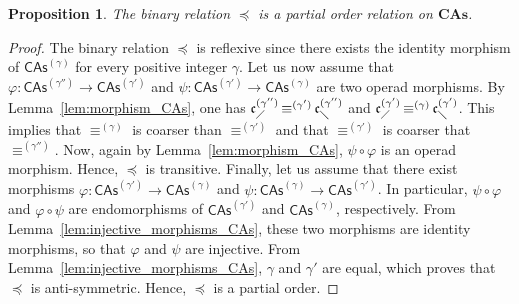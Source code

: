 \documentclass[10pt,reqno]{amsart}
\numberwithin{equation}{subsection}
\newtheorem{Proposition}[Theorem]{Proposition}
\newcommand{\CAs}[1]{\mathsf{CAs}^{(#1)}}
\newcommand{\CAsAll}{\mathbf{CAs}}
\newcommand{\LComb}[1]{\mathfrak{c}^{(#1)}_{\diagup}}
\newcommand{\RComb}[1]{\mathfrak{c}^{(#1)}_{\diagdown}}
\newcommand{\OrdCAs}{\preceq}
\DeclareMathOperator{\Congr}{\equiv}
\newcommand{\CongrCAs}[1]{\Congr^{(#1)}}
\begin{document}
\begin{Proposition}\label{prop:poset_CAs}
    The binary relation $\OrdCAs$ is a partial order relation on
    $\CAsAll$.
\end{Proposition}
\begin{proof}
    The binary relation $\OrdCAs$ is reflexive since there exists the
    identity morphism of $\CAs{\gamma}$ for every positive integer
    $\gamma$. Let us now assume that
    $\varphi:\CAs{\gamma''} \to \CAs{\gamma'}$ and
    $\psi:\CAs{\gamma'} \to \CAs{\gamma}$ are two operad morphisms. By
    Lemma~\ref{lem:morphism_CAs}, one has
    $\LComb{\gamma''} \CongrCAs{\gamma'} \RComb{\gamma''}$ and
    $\LComb{\gamma'} \CongrCAs{\gamma} \RComb{\gamma'}$. This implies
    that $\CongrCAs{\gamma}$ is coarser than $\CongrCAs{\gamma'}$ and
    that $\CongrCAs{\gamma'}$ is coarser that $\CongrCAs{\gamma''}$. Now,
    again by Lemma~\ref{lem:morphism_CAs}, $\psi \circ \varphi$ is an
    operad morphism. Hence, $\OrdCAs$ is transitive. Finally, let us
    assume that there exist morphisms
    $\varphi:\CAs{\gamma'}\to\CAs{\gamma}$ and
    $\psi:\CAs{\gamma}\to\CAs{\gamma'}$. In particular,
    $\psi \circ \varphi$ and $\varphi \circ \psi$ are endomorphisms of
    $\CAs{\gamma'}$ and $\CAs{\gamma}$, respectively. From
    Lemma~\ref{lem:injective_morphisms_CAs}, these two morphisms are
    identity morphisms, so that $\varphi$ and $\psi$ are injective. From
    Lemma~\ref{lem:injective_morphisms_CAs}, $\gamma$ and $\gamma'$ are
    equal, which proves that $\OrdCAs$ is anti-symmetric. Hence,
    $\OrdCAs$ is a partial order.
\end{proof}
\medbreak
\end{document}
